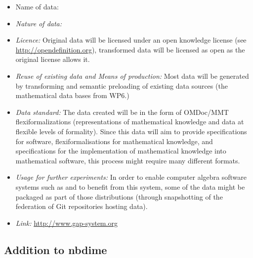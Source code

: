 \documentclass{deliverablereport}
\begin{document}
\begin{itemize}
\item{Name of data:}
\item\textit{Nature of data:}
\item\textit{Licence:} Original data will be licensed under an open knowledge license (see \url{http://opendefinition.org}), transformed data will be licensed as open as the original license allows it.
\item\textit{Reuse of existing data and Means of production:} Most data will be generated by transforming and semantic preloading of existing data sources (the mathematical data bases from WP6.)
\item\textit{Data standard:} The data created will be in the form of OMDoc/MMT flexiformalizations (representations of mathematical knowledge and data at flexible levels of formality). Since this data will aim to provide specifications for software, flexiformalisations for mathematical knowledge, and specifications for the implementation of mathematical knowledge into mathematical software, this process might require many different formats.
\item\textit{Usage for further experiments:} In order to enable computer algebra software systems such as \Sage and \GAP to benefit from this system, some of the data might be packaged as part of those distributions (through snapshotting of the federation of Git repositories hosting data).
\item\textit{Link:} \href{http://www.gap-system.org}{http://www.gap-system.org}
\end{itemize}


\subsection{Addition to nbdime}
\end{document}
